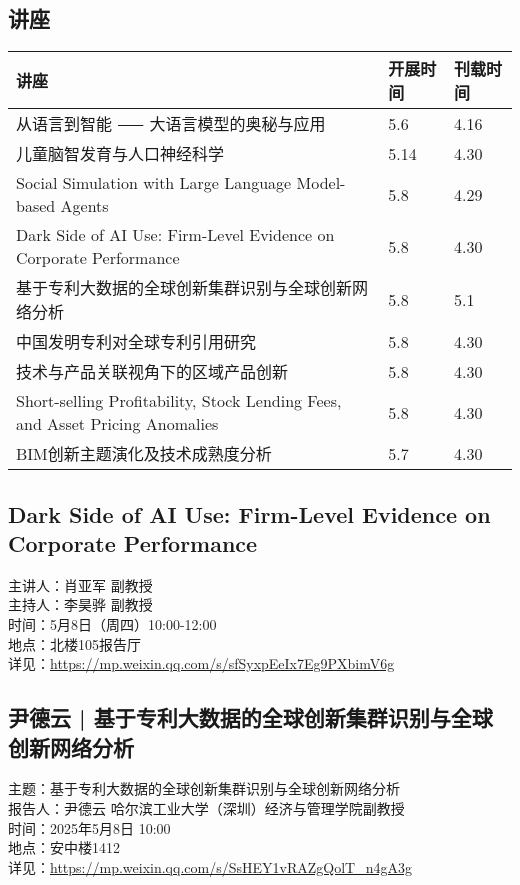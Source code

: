 \documentclass[letterpaper, 12pt]{article}
\begin{document}
\begin{multicols}{2}
\pagebreak

\section{讲座}
\begin{tabular}{|>{\centering\arraybackslash}m{}|m{}|m{}|}
    \hline
    讲座 & 开展时间 & 刊载时间\\
    \hline\hline
    从语言到智能 ⸺ 大语言模型的奥秘与应用 & 5.6 & 4.16\\\hline
    儿童脑智发育与人口神经科学 & 5.14 & 4.30\\\hline
    Social Simulation with Large Language Model-based Agents & 5.8 & 4.29\\\hline
    Dark Side of AI Use: Firm-Level Evidence on Corporate Performance & 5.8 & 4.30\\\hline
    基于专利大数据的全球创新集群识别与全球创新网络分析 & 5.8 & 5.1\\\hline
    中国发明专利对全球专利引用研究 & 5.8 & 4.30\\\hline
    技术与产品关联视角下的区域产品创新 & 5.8 & 4.30\\\hline
    Short-selling Profitability, Stock Lending Fees, and Asset Pricing Anomalies & 5.8 & 4.30\\\hline
    BIM创新主题演化及技术成熟度分析 & 5.7 & 4.30\\\hline
\end{tabular}
\subsection{Dark Side of AI Use: Firm-Level Evidence on Corporate Performance} %
主讲人：肖亚军  副教授
\\主持人：李昊骅  副教授
\\时间：5月8日（周四）10:00-12:00
\\地点：北楼105报告厅
\\详见：\url{https://mp.weixin.qq.com/s/sfSyxpEeIx7Eg9PXbimV6g}

\subsection{尹德云 | 基于专利大数据的全球创新集群识别与全球创新网络分析} %
主题：基于专利大数据的全球创新集群识别与全球创新网络分析
\\报告人：尹德云 哈尔滨工业大学（深圳）经济与管理学院副教授
\\时间：2025年5月8日 10:00
\\地点：安中楼1412 
\\详见：\url{https://mp.weixin.qq.com/s/SsHEY1vRAZgQolT_n4gA3g}


\end{multicols}
\end{document}
